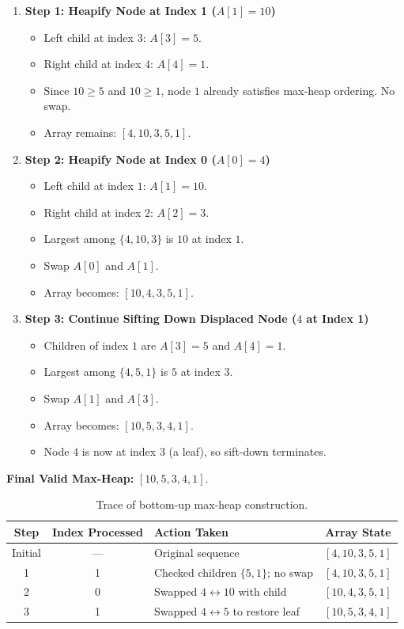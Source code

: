 \begin{enumerate}
    \item \textbf{Step 1: Heapify Node at Index 1 ($A[1] = 10$)}
    \begin{itemize}
        \item Left child at index $3$: $A[3] = 5$.
        \item Right child at index $4$: $A[4] = 1$.
        \item Since $10 \geq 5$ and $10 \geq 1$, node $1$ already satisfies max-heap ordering. No swap.
        \item Array remains: $[4, 10, 3, 5, 1]$.
    \end{itemize}

    \item \textbf{Step 2: Heapify Node at Index 0 ($A[0] = 4$)}
    \begin{itemize}
        \item Left child at index $1$: $A[1] = 10$.
        \item Right child at index $2$: $A[2] = 3$.
        \item Largest among $\{4, 10, 3\}$ is $10$ at index $1$.
        \item Swap $A[0]$ and $A[1]$.
        \item Array becomes: $[10, 4, 3, 5, 1]$.
    \end{itemize}

    \item \textbf{Step 3: Continue Sifting Down Displaced Node ($4$ at Index 1)}
    \begin{itemize}
        \item Children of index $1$ are $A[3] = 5$ and $A[4] = 1$.
        \item Largest among $\{4, 5, 1\}$ is $5$ at index $3$.
        \item Swap $A[1]$ and $A[3]$.
        \item Array becomes: $[10, 5, 3, 4, 1]$.
        \item Node $4$ is now at index $3$ (a leaf), so sift-down terminates.
    \end{itemize}
\end{enumerate}

\textbf{Final Valid Max-Heap:} $[10, 5, 3, 4, 1]$.

\begin{table}[htbp]
\centering
\small
\begin{tabularx}{0.85\textwidth}{cc X c}
\toprule
\textbf{Step} & \textbf{Index Processed} & \textbf{Action Taken} & \textbf{Array State} \\
\midrule
Initial & --- & Original sequence & $[4, 10, 3, 5, 1]$ \\
1       & 1   & Checked children $\{5, 1\}$; no swap & $[4, 10, 3, 5, 1]$ \\
2       & 0   & Swapped $4 \leftrightarrow 10$ with child & $[10, 4, 3, 5, 1]$ \\
3       & 1   & Swapped $4 \leftrightarrow 5$ to restore leaf & $[10, 5, 3, 4, 1]$ \\
\bottomrule
\end{tabularx}
\caption{Trace of bottom-up max-heap construction.}
\end{table}

